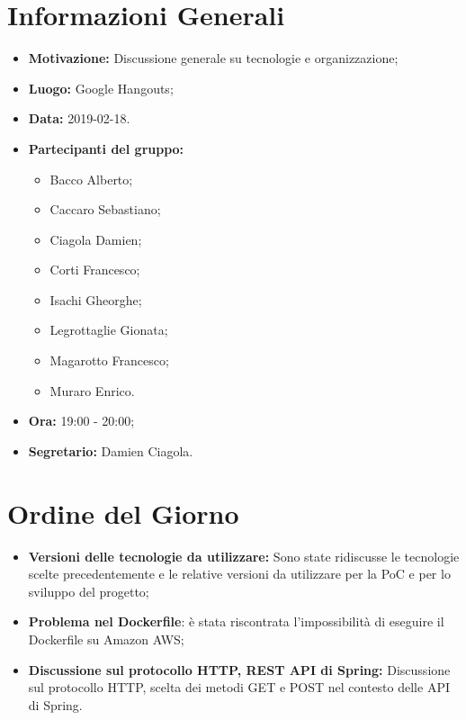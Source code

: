 \documentclass[a4paper, oneside, openany, dvipsnames, table]{article}
\begin{document}
\copertina{}


\newpage
\tableofcontents
\newpage
\section{Informazioni Generali}
\begin{itemize}
\item \textbf{Motivazione:} Discussione generale su tecnologie e organizzazione;
\item \textbf{Luogo:} Google Hangouts;
\item \textbf{Data:} 2019-02-18.
\item \textbf{Partecipanti del gruppo:} \hfill
	\begin{itemize}
	\item Bacco Alberto;
	\item Caccaro Sebastiano;
	\item Ciagola Damien;
	\item Corti Francesco;
	\item Isachi Gheorghe;
	\item Legrottaglie Gionata;
	\item Magarotto Francesco;
	\item Muraro Enrico.
	\end{itemize} 
\item \textbf{Ora:} 19:00 - 20:00;
\item \textbf{Segretario:} Damien Ciagola.
\end{itemize}

\section{Ordine del Giorno}
\begin{itemize}
\item \textbf{Versioni delle tecnologie da utilizzare:} Sono state ridiscusse le tecnologie scelte precedentemente e le relative versioni da utilizzare per la PoC e per lo sviluppo del progetto;
\item \textbf{Problema nel Dockerfile}: è stata riscontrata l'impossibilità di eseguire il Dockerfile su Amazon AWS;
\item \textbf{Discussione sul protocollo HTTP, REST API di Spring:}
Discussione sul protocollo HTTP, scelta dei metodi GET e POST nel contesto delle API di Spring.
\end{itemize}
\end{document}
